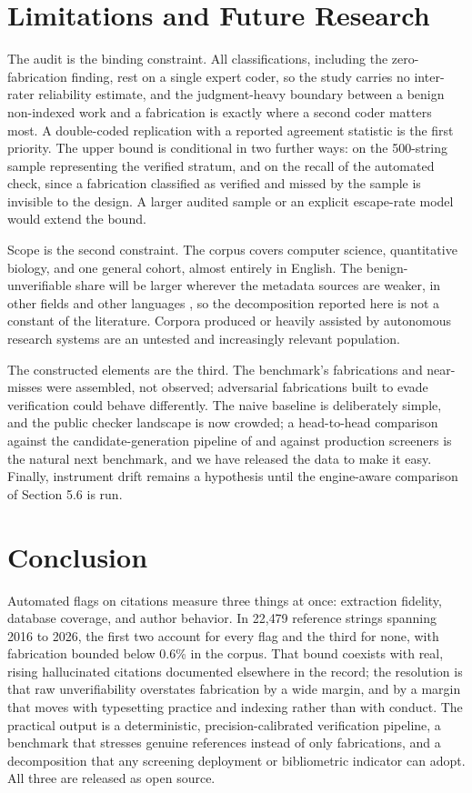 \documentclass[11pt, a4paper]{article}
\begin{document}
\section{Limitations and Future Research}
The audit is the binding constraint. All classifications, including the zero-fabrication finding, rest on a single expert coder, so the study carries no inter-rater reliability estimate, and the judgment-heavy boundary between a benign non-indexed work and a fabrication is exactly where a second coder matters most. A double-coded replication with a reported agreement statistic is the first priority. The upper bound is conditional in two further ways: on the 500-string sample representing the verified stratum, and on the recall of the automated check, since a fabrication classified as verified and missed by the sample is invisible to the design. A larger audited sample or an explicit escape-rate model would extend the bound.

Scope is the second constraint. The corpus covers computer science, quantitative biology, and one general cohort, almost entirely in English. The benign-unverifiable share will be larger wherever the metadata sources are weaker, in other fields and other languages \citep{verabaceta2019}, so the decomposition reported here is not a constant of the literature. Corpora produced or heavily assisted by autonomous research systems \citep{lu2024} are an untested and increasingly relevant population.

The constructed elements are the third. The benchmark's fabrications and near-misses were assembled, not observed; adversarial fabrications built to evade verification could behave differently. The naive baseline is deliberately simple, and the public checker landscape is now crowded; a head-to-head comparison against the candidate-generation pipeline of \citet{sakai2026} and against production screeners is the natural next benchmark, and we have released the data to make it easy. Finally, instrument drift remains a hypothesis until the engine-aware comparison of Section 5.6 is run.

\section{Conclusion}
Automated flags on citations measure three things at once: extraction fidelity, database coverage, and author behavior. In 22{,}479 reference strings spanning 2016 to 2026, the first two account for every flag and the third for none, with fabrication bounded below 0.6\% in the corpus. That bound coexists with real, rising hallucinated citations documented elsewhere in the record; the resolution is that raw unverifiability overstates fabrication by a wide margin, and by a margin that moves with typesetting practice and indexing rather than with conduct. The practical output is a deterministic, precision-calibrated verification pipeline, a benchmark that stresses genuine references instead of only fabrications, and a decomposition that any screening deployment or bibliometric indicator can adopt. All three are released as open source.
\end{document}
